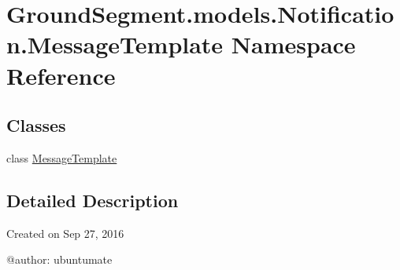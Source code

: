 \hypertarget{namespace_ground_segment_1_1models_1_1_notification_1_1_message_template}{}\section{Ground\+Segment.\+models.\+Notification.\+Message\+Template Namespace Reference}
\label{namespace_ground_segment_1_1models_1_1_notification_1_1_message_template}
\subsection*{Classes}
\begin{DoxyCompactItemize}
\item 
class \hyperlink{class_ground_segment_1_1models_1_1_notification_1_1_message_template_1_1_message_template}{Message\+Template}
\end{DoxyCompactItemize}


\subsection{Detailed Description}
\begin{DoxyVerb}Created on Sep 27, 2016

@author: ubuntumate
\end{DoxyVerb}
 